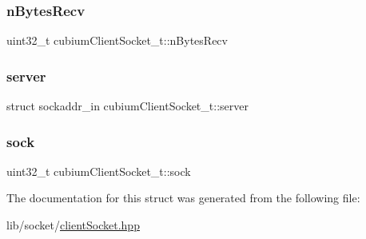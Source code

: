 \subsubsection{\texorpdfstring{n\+Bytes\+Recv}{nBytesRecv}}
{\footnotesize\ttfamily uint32\+\_\+t cubium\+Client\+Socket\+\_\+t\+::n\+Bytes\+Recv}

\mbox{\label{structcubiumClientSocket__t_ad89460d48cb94e5cda49ed0481e927f1}} 
\subsubsection{\texorpdfstring{server}{server}}
{\footnotesize\ttfamily struct sockaddr\+\_\+in cubium\+Client\+Socket\+\_\+t\+::server}

\mbox{\label{structcubiumClientSocket__t_abaa0344892988ffb56dea7f82b88cbc3}} 
\subsubsection{\texorpdfstring{sock}{sock}}
{\footnotesize\ttfamily uint32\+\_\+t cubium\+Client\+Socket\+\_\+t\+::sock}



The documentation for this struct was generated from the following file\+:\begin{DoxyCompactItemize}
\item 
lib/socket/\hyperlink{clientSocket_8hpp}{client\+Socket.\+hpp}\end{DoxyCompactItemize}
